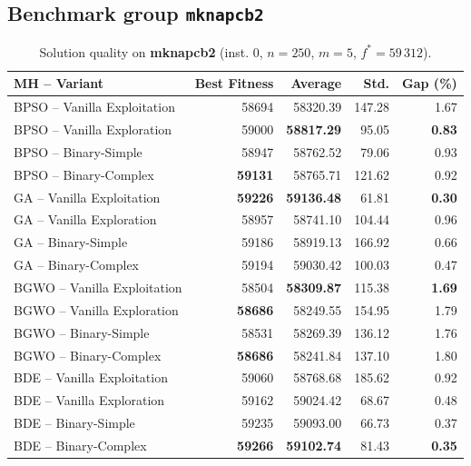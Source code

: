 \documentclass[journal,article,submit,moreauthors]{Definitions/mdpi}
\begin{document}
\clearpage
\subsection{Benchmark group \texttt{mknapcb2}}

\begin{table}[htbp]
  \centering
  \small
  \caption{Solution quality on \textbf{mknapcb2} (inst. 0, $n=250$, $m=5$, $f^*=59\,312$).}
  \label{tab:calidad_mknapcb2_0}
  \begin{tabular}{lrrrr}
    \toprule
    \textbf{MH -- Variant} &
    \textbf{Best Fitness} &
    \textbf{Average} &
    \textbf{Std.} &
    \textbf{Gap (\%)} \\
    \midrule
    BPSO -- Vanilla Exploitation &          58694 &         58320.39 & 147.28 &         1.67 \\
    BPSO -- Vanilla Exploration  &          59000 & \textbf{58817.29} &  95.05 & \textbf{0.83} \\
    BPSO -- Binary-Simple        &          58947 &         58762.52 &  79.06 &         0.93 \\
    BPSO -- Binary-Complex       & \textbf{59131} &         58765.71 & 121.62 &         0.92 \\
    \midrule
    GA -- Vanilla Exploitation   & \textbf{59226} & \textbf{59136.48} &  61.81 & \textbf{0.30} \\
    GA -- Vanilla Exploration    &          58957 &         58741.10 & 104.44 &         0.96 \\
    GA -- Binary-Simple          &          59186 &         58919.13 & 166.92 &         0.66 \\
    GA -- Binary-Complex         &          59194 &         59030.42 & 100.03 &         0.47 \\
    \midrule
    BGWO -- Vanilla Exploitation &          58504 & \textbf{58309.87} & 115.38 & \textbf{1.69} \\
    BGWO -- Vanilla Exploration  & \textbf{58686} &         58249.55 & 154.95 &         1.79 \\
    BGWO -- Binary-Simple        &          58531 &         58269.39 & 136.12 &         1.76 \\
    BGWO -- Binary-Complex       & \textbf{58686} &         58241.84 & 137.10 &         1.80 \\
    \midrule
    BDE -- Vanilla Exploitation  &          59060 &         58768.68 & 185.62 &         0.92 \\
    BDE -- Vanilla Exploration   &          59162 &         59024.42 &  68.67 &         0.48 \\
    BDE -- Binary-Simple         &          59235 &         59093.00 &  66.73 &         0.37 \\
    BDE -- Binary-Complex        & \textbf{59266} & \textbf{59102.74} &  81.43 & \textbf{0.35} \\
    \bottomrule
  \end{tabular}
\end{table}
\end{document}
